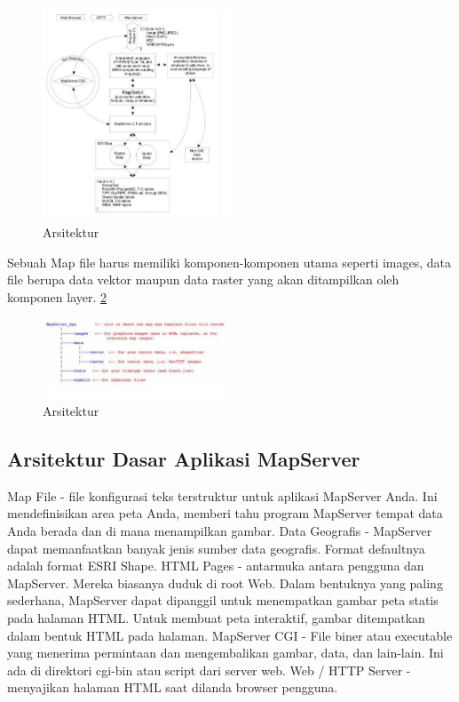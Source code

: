 \begin{figure}[ht]
	    \centerline{\includegraphics[width=0.50\textwidth]{figures/gambar7.JPG}}
	    \caption{Arsitektur}
		\label{gambar7}
		\end{figure}
		
Sebuah Map file harus memiliki komponen-komponen utama seperti images, data file berupa data vektor maupun data raster yang akan ditampilkan oleh komponen layer. \ref{gambar8}

\begin{figure}[ht]
	    \centerline{\includegraphics[width=0.50\textwidth]{figures/gambar8.JPG}}
	    \caption{Arsitektur}
		\label{gambar8}
		\end{figure}

\subsection{Arsitektur Dasar Aplikasi MapServer}
Map File - file konfigurasi teks terstruktur untuk aplikasi MapServer Anda. Ini mendefinisikan area peta Anda, memberi tahu program MapServer tempat data Anda berada dan di mana menampilkan gambar.
Data Geografis - MapServer dapat memanfaatkan banyak jenis sumber data geografis. Format defaultnya adalah format ESRI Shape.
HTML Pages - antarmuka antara pengguna dan MapServer. Mereka biasanya duduk di root Web. Dalam bentuknya yang paling sederhana, MapServer dapat dipanggil untuk menempatkan gambar peta statis pada halaman HTML. Untuk membuat peta interaktif, gambar ditempatkan dalam bentuk HTML pada halaman.
MapServer CGI - File biner atau executable yang menerima permintaan dan mengembalikan gambar, data, dan lain-lain. Ini ada di direktori cgi-bin atau script dari server web.
Web / HTTP Server - menyajikan halaman HTML saat dilanda browser pengguna.

